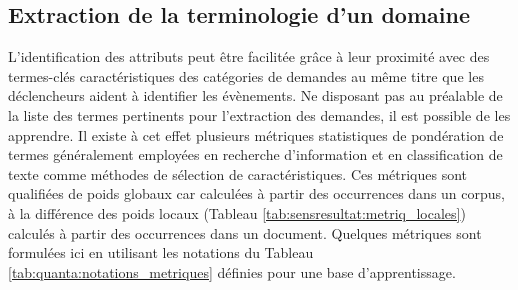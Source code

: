 \subsection{Extraction de la terminologie d'un domaine}
\label{sec:quanta:extract-terminologie-domaine}
L'identification des attributs peut être facilitée grâce à leur proximité avec des termes-clés caractéristiques des catégories de demandes au même titre que les \og déclencheurs \fg{} aident à identifier les évènements.
Ne disposant pas au préalable de la liste des termes pertinents pour l'extraction des demandes, il est possible de les apprendre. Il existe à cet effet plusieurs métriques statistiques de pondération de termes généralement employées en recherche d'information et en classification de texte comme méthodes de sélection de caractéristiques. Ces métriques sont qualifiées de poids globaux car calculées à partir des occurrences dans un corpus, à la différence des poids locaux (Tableau \ref{tab:sensresultat:metriq_locales}) calculés à partir des occurrences dans un document. Quelques métriques sont formulées ici en utilisant les notations du Tableau \ref{tab:quanta:notations_metriques} définies pour une base d'apprentissage.


